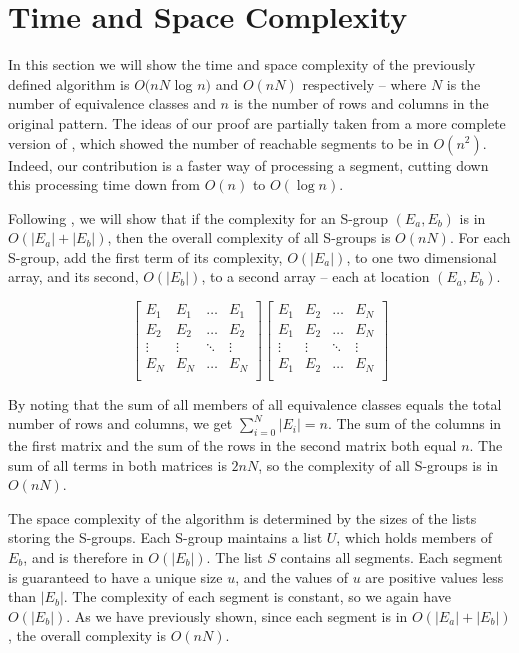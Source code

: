 \section{Time and Space Complexity}
\label{s_run}


In this section we will show the time and space complexity of the previously defined algorithm is $O(nN$ log $n)$ and $O(nN)$ respectively -- where $N$ is the number of equivalence classes and $n$ is the number of rows and columns in the original pattern. 
The ideas of our proof are partially taken from 
a more complete version of \cite{ACJKLW07},
 which showed the number of reachable segments to be in $O(n^2)$.
Indeed, our contribution is a faster way of processing a segment,
cutting down this processing time down from $O(n)$ to $O(\log n)$.

Following \cite{ACJKLW07},
we will show that if the complexity for an S-group $(E_a,E_b)$ is in $O(|E_a| + |E_b|)$, then the overall complexity of all S-groups is $O(nN)$.
For each S-group, add the first term of its complexity, $O(|E_a|)$, to one two dimensional array, and its second, $O(|E_b|)$, to a second array -- each at location $(E_a,E_b)$.

\[
\begin{bmatrix}
    E_1 &  E_1 & \dots & E_1\\
    E_2 &  E_2 & \dots & E_2\\
    \vdots & \vdots & \ddots & \vdots \\
    E_N &  E_N & \dots & E_N\\
\end{bmatrix}
\begin{bmatrix}
    E_1 &  E_2 & \dots & E_N\\
    E_1 &  E_2 & \dots & E_N\\
    \vdots & \vdots & \ddots & \vdots \\
    E_1 &  E_2 & \dots & E_N\\
\end{bmatrix}
\]
 
By noting that the sum of all members of all equivalence classes equals the total number of rows and columns, we get $\sum_{i=0}^N{|E_i|} = n$. 
The sum of the columns in the first matrix and the sum of the rows in the second matrix both equal $n$. 
The sum of all terms in both matrices is $2nN$, so the complexity of all S-groups is in $O(nN)$.

The space complexity of the algorithm is determined by the sizes of the lists storing the S-groups. 
Each S-group maintains a list $U$, which holds members of $E_b$,
 and is therefore in $O(|E_b|)$. The list $S$ contains all segments. 
Each segment is guaranteed to have a unique size $u$, 
and the values of $u$ are positive values less than $|E_b|$. 
The complexity of each segment is constant, so we again have $O(|E_b|)$. 
As we have previously shown, since each segment is in 
$O(|E_a| + |E_b|)$, the overall complexity is $O(nN)$. 

